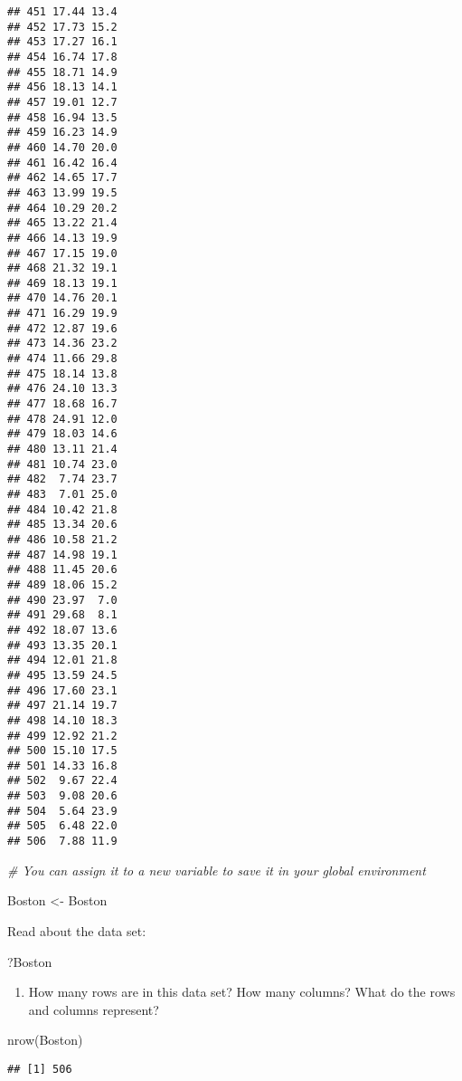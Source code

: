\documentclass[
]{article}
\newenvironment{Shaded}{\begin{snugshade}}{\end{snugshade}}
\newcommand{\CommentTok}[1]{\textcolor[rgb]{0.56,0.35,0.01}{\textit{#1}}}
\newcommand{\FunctionTok}[1]{\textcolor[rgb]{0.00,0.00,0.00}{#1}}
\newcommand{\NormalTok}[1]{#1}
\newcommand{\OtherTok}[1]{\textcolor[rgb]{0.56,0.35,0.01}{#1}}
\providecommand{\tightlist}{%
  \setlength{\itemsep}{0pt}\setlength{\parskip}{0pt}}
\begin{document}
\begin{verbatim}
## 451 17.44 13.4
## 452 17.73 15.2
## 453 17.27 16.1
## 454 16.74 17.8
## 455 18.71 14.9
## 456 18.13 14.1
## 457 19.01 12.7
## 458 16.94 13.5
## 459 16.23 14.9
## 460 14.70 20.0
## 461 16.42 16.4
## 462 14.65 17.7
## 463 13.99 19.5
## 464 10.29 20.2
## 465 13.22 21.4
## 466 14.13 19.9
## 467 17.15 19.0
## 468 21.32 19.1
## 469 18.13 19.1
## 470 14.76 20.1
## 471 16.29 19.9
## 472 12.87 19.6
## 473 14.36 23.2
## 474 11.66 29.8
## 475 18.14 13.8
## 476 24.10 13.3
## 477 18.68 16.7
## 478 24.91 12.0
## 479 18.03 14.6
## 480 13.11 21.4
## 481 10.74 23.0
## 482  7.74 23.7
## 483  7.01 25.0
## 484 10.42 21.8
## 485 13.34 20.6
## 486 10.58 21.2
## 487 14.98 19.1
## 488 11.45 20.6
## 489 18.06 15.2
## 490 23.97  7.0
## 491 29.68  8.1
## 492 18.07 13.6
## 493 13.35 20.1
## 494 12.01 21.8
## 495 13.59 24.5
## 496 17.60 23.1
## 497 21.14 19.7
## 498 14.10 18.3
## 499 12.92 21.2
## 500 15.10 17.5
## 501 14.33 16.8
## 502  9.67 22.4
## 503  9.08 20.6
## 504  5.64 23.9
## 505  6.48 22.0
## 506  7.88 11.9
\end{verbatim}

\begin{Shaded}
\begin{Highlighting}[]
\CommentTok{\# You can assign it to a new variable to save it in your global environment}

\NormalTok{Boston }\OtherTok{\textless{}{-}}\NormalTok{ Boston}
\end{Highlighting}
\end{Shaded}

Read about the data set:

\begin{Shaded}
\begin{Highlighting}[]
\NormalTok{?Boston}
\end{Highlighting}
\end{Shaded}

\begin{enumerate}
\def\labelenumi{\alph{enumi}.}
\tightlist
\item
  How many rows are in this data set? How many columns? What do the rows
  and columns represent?
\end{enumerate}

\begin{Shaded}
\begin{Highlighting}[]
\FunctionTok{nrow}\NormalTok{(Boston)}
\end{Highlighting}
\end{Shaded}

\begin{verbatim}
## [1] 506
\end{verbatim}
\end{document}
